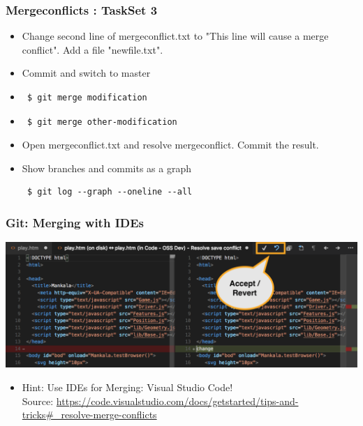 \documentclass{beamer} %
\begin{document}
\begin{frame}[t, fragile]
\frametitle{Mergeconflicts : TaskSet 3}
\begin{itemize}
\item Change second line of mergeconflict.txt to "This line will cause a merge conflict". Add a file "newfile.txt". 
\item Commit and switch to master 
\item \begin{verbatim} 
 $ git merge modification
 \end{verbatim}
 \item \begin{verbatim} 
 $ git merge other-modification
 \end{verbatim}
 \item Open mergeconflict.txt and resolve mergeconflict. Commit the result.
 \item Show branches and commits as a graph \begin{verbatim}
 $ git log --graph --oneline --all
 \end{verbatim}
\end{itemize}
\end{frame}

\begin{frame}[t, fragile]
	\frametitle{Git: Merging with IDEs}
	\begin{center}
		
		\includegraphics[scale=0.3]{assets/visualstudiocode-merging.png}
		
	\end{center}
	\begin{itemize}
		\item Hint: Use IDEs for Merging: Visual Studio Code! \\
		Source: \url{https://code.visualstudio.com/docs/getstarted/tips-and-tricks#_resolve-merge-conflicts}
		
	\end{itemize}
\end{frame}
\end{document}
